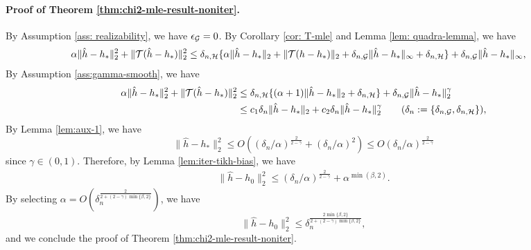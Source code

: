 \paragraph{Proof of Theorem \ref{thm:chi2-mle-result-noniter}.}
By Assumption \ref{ass: realizability}, we have $\epsilon_{\mathcal{G}} = 0$. By Corollary \ref{cor: T-mle} and Lemma \ref{lem: quadra-lemma}, we have \begin{align*}
      \alpha \|\hat h - h_* \|^2_2 + \|{\mathcal{T}}(\hat h-h_*)\|^2_2&\leq \delta_{n,\mathcal{H}}\{ \alpha \|\hat h-h_*\|_{2} + \|{\mathcal{T}}(h-h_*)\|_2 +   \delta_{n,\mathcal{G}} \|\hat{h} - h_*\|_\infty+   \delta_{n,\mathcal{H}}  \}+  \delta_{n,\mathcal{G}} \|\hat{h} - h_*\|_\infty ,
\end{align*}
By Assumption \ref{ass:gamma-smooth}, we have \begin{align*}
\alpha \|\hat h - h_* \|^2_2 + \|\Tcal(\hat h-h_*)\|^2_2 &\leq \delta_{n,\Hcal}\{ (\alpha +1)\|\hat h-h_*\|_{2} +   \delta_{n,\Hcal}   \}+  \delta_{n,\Gcal} \|\hat{h} - h_*\|_2^\gamma\\
&\leq c_1 \delta_n\|\hat{h} - h_*\|_2 +c_2 \delta_n \|\hat{h} - h_*\|_2^\gamma \tag{$\delta_n := \{\delta_{n,\Gcal}, \delta_{n,\Hcal}\}$},
\end{align*}
By Lemma \ref{lem:aux-1}, we have $$
\|\hat{h} - h_{*}\|_2^2 \leq O((\delta_n/\alpha)^{\frac{2}{2-\gamma}} + (\delta_n/\alpha)^2)  \leq O(\delta_n/\alpha)^{\frac{2}{2-\gamma}}
$$
since $\gamma \in (0,1)$. Therefore, by Lemma \ref{lem:iter-tikh-bias}, we have \begin{align*}
    \|\hat h-h_0 \|^2_2\leq  (\delta_n/\alpha)^{\frac{2}{2-\gamma}}+ \alpha^{\min(\beta,2)}.
\end{align*}
By selecting $\alpha = O(\delta_n^{\frac{2}{2+ (2 - \gamma)\min\{\beta,2\}}})$, we have $$
\|\hat h-h_0 \|^2_2\leq \delta_n^{\frac{2\min\{\beta,2\}}{2+ (2 - \gamma)\min\{\beta,2\}}},
$$
and we conclude the proof of Theorem \ref{thm:chi2-mle-result-noniter}.
